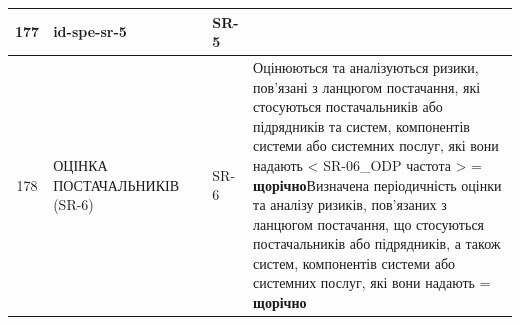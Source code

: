 \documentclass[10pt]{article}
\begin{document}
\begin{longtable}{|c|>{\raggedright\arraybackslash}p{2.5cm}|>{\raggedright\arraybackslash}p{4.5cm}|>{\raggedright\arraybackslash}p{3cm}|>{\raggedright\arraybackslash}p{4.5cm}|}
177 & id-spe-sr-5 &  & SR-5 &  \\ \hline
178 & ОЦІНКА ПОСТАЧАЛЬНИКІВ (SR-6) &  & SR-6 & Оцінюються та аналізуються ризики, пов'язані з ланцюгом постачання, які стосуються постачальників або підрядників та систем, компонентів системи або системних послуг, які вони надають < SR-06\_\allowbreak{}ODP частота > = \textbf{щорічно}\newline Визначена періодичність оцінки та аналізу ризиків, пов'язаних з ланцюгом постачання, що стосуються постачальників або підрядників, а також систем, компонентів системи або системних послуг, які вони надають = \textbf{щорічно} \\ \hline


\end{longtable}
\end{document}
